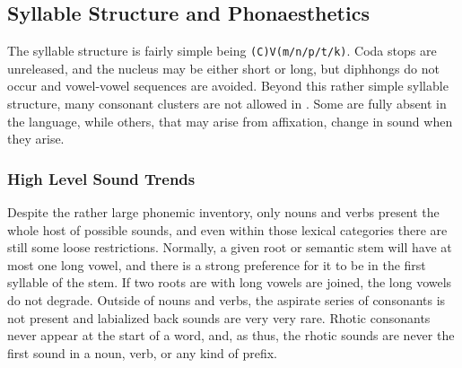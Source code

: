 \subsection{Syllable Structure and Phonaesthetics}
  The syllable structure is fairly simple being \texttt{(C)V(m/n/p/t/k)}. Coda stops are unreleased, and the nucleus may be either short or long, but diphhongs do not occur and vowel-vowel sequences are avoided. Beyond this rather simple syllable structure, many consonant clusters are not allowed in \langname. Some are fully absent in the language, while others, that may arise from affixation, change in sound when they arise.
\subsubsection{High Level Sound Trends}
  Despite the rather large phonemic inventory, only nouns and verbs present the whole host of possible sounds, and even within those lexical categories there are still some loose restrictions. Normally, a given root or semantic stem will have at most one long vowel, and there is a strong preference for it to be in the first syllable of the stem. If two roots are with long vowels are joined, the long vowels do not degrade. Outside of nouns and verbs, the aspirate series of consonants is not present and labialized back sounds are very very rare. Rhotic consonants never appear at the start of a word, and, as thus, the rhotic sounds are never the first sound in a noun, verb, or any kind of prefix.\par
